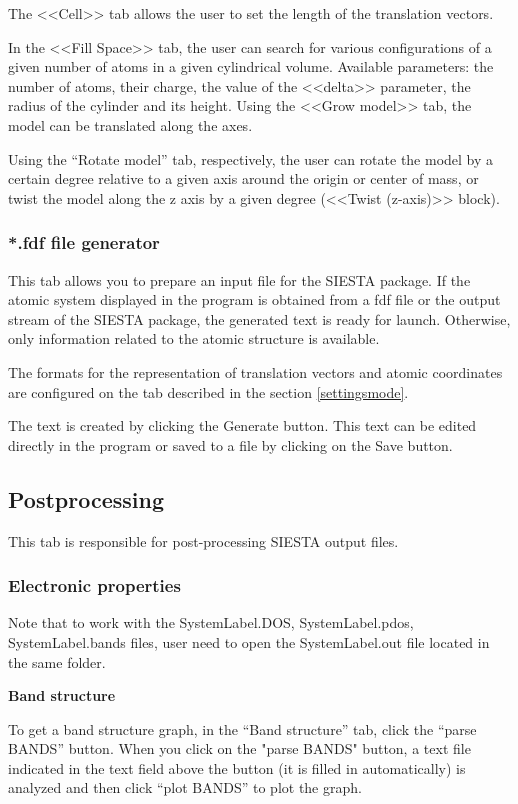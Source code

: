 \documentclass{article}
\begin{document}
The <<Cell>> tab allows the user to set the length of the translation vectors.

In the <<Fill Space>> tab, the user can search for various configurations of a given number of atoms in a given cylindrical volume. Available parameters: the number of atoms, their charge, the value of the <<delta>> parameter, the radius of the cylinder and its height.
Using the <<Grow model>> tab, the model can be translated along the axes.

Using the “Rotate model” tab, respectively, the user can rotate the model by a certain degree relative to a given axis around the origin or center of mass, or twist the model along the z axis by a given degree (<<Twist (z-axis)>> block).

\subsubsection{*.fdf file generator}

This tab allows you to prepare an input file for the SIESTA package. If the atomic system displayed in the program is obtained from a fdf file or the output stream of the SIESTA package, the generated text is ready for launch. Otherwise, only information related to the atomic structure is available.

The formats for the representation of translation vectors and atomic coordinates are configured on the tab described in the section \ref{settingsmode}.

The text is created by clicking the Generate button. This text can be edited directly in the program or saved to a file by clicking on the Save button.


\subsection{Postprocessing}

This tab is responsible for post-processing SIESTA output files.

\subsubsection{Electronic properties}

Note that to work with the SystemLabel.DOS, SystemLabel.pdos, SystemLabel.bands files, user need to open the SystemLabel.out file located in the same folder.


\textbf{Band structure}

To get a band structure graph, in the “Band structure” tab, click the “parse BANDS” button. When you click on the "parse BANDS" button, a text file indicated in the text field above the button (it is filled in automatically) is analyzed and then click “plot BANDS” to plot the graph. 
\end{document}
